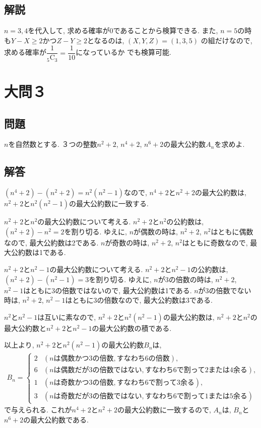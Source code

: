 \documentclass[dvipdfmx,a4paper]{jsarticle}
\newcommand{\comb}[2]{{}_{#1}\mathrm{C}_{#2}}
\newcommand{\2}{I\hspace{-1pt}I}
\newcommand{\3}{I\hspace{-1pt}I\hspace{-1pt}I}
\begin{document}
    \subsection{解説}
    $n=3,4$を代入して, 求める確率が0であることから検算できる. 
    また, $n=5$の時も$Y-X \geq 2$かつ$Z-Y \geq 2$となるのは, $(X,Y,Z)=(1,3,5)$
    の組だけなので, 求める確率が$\dfrac{1}{\comb{5}{3}}=\dfrac{1}{10}$になっているか
    でも検算可能. 


    \section{大問３}
    \subsection{問題}
    $n$を自然数とする. ３つの整数$n^2+2$, $n^4+2$, $n^6+2$の最大公約数$A_n$を求めよ. 

    \subsection{解答}
    $(n^4+2) - (n^2+2) = n^2(n^2-1)$なので, $n^4+2$と$n^2+2$の最大公約数は, 
    $n^2+2$と$n^2(n^2-1)$の最大公約数に一致する. 

    $n^2+2$と$n^2$の最大公約数について考える. 
    $n^2+2$と$n^2$の公約数は, $(n^2+2)-n^2=2$を割り切る. 
    ゆえに, $n$が偶数の時は, $n^2+2$, $n^2$はともに偶数なので, 最大公約数は2である. 
    $n$が奇数の時は, $n^2+2$, $n^2$はともに奇数なので, 最大公約数は1である. 

    $n^2+2$と$n^2-1$の最大公約数について考える. 
    $n^2+2$と$n^2-1$の公約数は, $(n^2+2)-(n^2-1)=3$を割り切る. 
    ゆえに, $n$が3の倍数の時は, $n^2+2$, $n^2-1$はともに3の倍数ではないので, 最大公約数は1である. 
    $n$が3の倍数でない時は, $n^2+2$, $n^2-1$はともに3の倍数なので, 最大公約数は3である. 

    $n^2$と$n^2-1$は互いに素なので, $n^2+2$と$n^2(n^2-1)$の最大公約数は, 
    $n^2+2$と$n^2$の最大公約数と$n^2+2$と$n^2-1$の最大公約数の積である. 

    以上より, $n^2+2$と$n^2(n^2-1)$の最大公約数$B_n$は, 
    \begin{eqnarray*}
        B_n = \left\{
            \begin{array}{lll}
                2 & (n\mathrm{は偶数かつ3の倍数, すなわち6の倍数}), \\
                6 & (n\mathrm{は偶数だが3の倍数ではない, すなわち6で割って2または4余る}), \\
                1 & (n\mathrm{は奇数かつ3の倍数, すなわち6で割って3余る}), \\
                3 & (n\mathrm{は奇数だが3の倍数ではない, すなわち6で割って1または5余る})
            \end{array}
        \right.
    \end{eqnarray*}
    で与えられる. これが$n^4+2$と$n^2+2$の最大公約数に一致するので, 
    $A_n$は, $B_n$と$n^6+2$の最大公約数である. 
    
\end{document}

